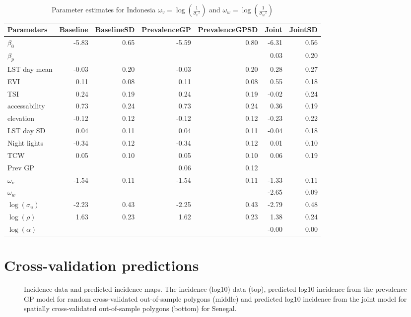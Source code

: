 \documentclass[10pt,a4]{article}
\begin{document}
\begin{table}[ht]
\centering
\begin{tabular}{lrrrrrr}
  \hline
Parameters & Baseline & BaselineSD & PrevalenceGP & PrevalenceGPSD & Joint & JointSD \\ 
  \hline
$\beta_0$ & -5.83 & 0.65 & -5.59 & 0.80 & -6.31 & 0.56 \\ 
  $\beta_p$ &  &  &  &  & 0.03 & 0.20 \\ 
  LST day mean & -0.03 & 0.20 & -0.03 & 0.20 & 0.28 & 0.27 \\ 
  EVI & 0.11 & 0.08 & 0.11 & 0.08 & 0.55 & 0.18 \\ 
  TSI & 0.24 & 0.19 & 0.24 & 0.19 & -0.02 & 0.24 \\ 
  accessability & 0.73 & 0.24 & 0.73 & 0.24 & 0.36 & 0.19 \\ 
  elevation & -0.12 & 0.12 & -0.12 & 0.12 & -0.23 & 0.22 \\ 
  LST day SD & 0.04 & 0.11 & 0.04 & 0.11 & -0.04 & 0.18 \\ 
  Night lights & -0.34 & 0.12 & -0.34 & 0.12 & 0.01 & 0.10 \\ 
  TCW & 0.05 & 0.10 & 0.05 & 0.10 & 0.06 & 0.19 \\ 
  Prev GP &  &  & 0.06 & 0.12 &  &  \\ 
  $\omega_v$ & -1.54 & 0.11 & -1.54 & 0.11 & -1.33 & 0.11 \\ 
  $\omega_w$ &  &  &  &  & -2.65 & 0.09 \\ 
  $\log(\sigma_u)$ & -2.23 & 0.43 & -2.25 & 0.43 & -2.79 & 0.48 \\ 
  $\log(\rho)$ & 1.63 & 0.23 & 1.62 & 0.23 & 1.38 & 0.24 \\ 
  $\log(\alpha)$ &  &  &  &  & -0.00 & 0.00 \\ 
   \hline
\end{tabular}
\label{parsidn}
\caption{Parameter estimates for Indonesia $\omega_v = \log\left(\frac{1}{{\sigma_v}^2}\right)$ and $\omega_w = \log\left(\frac{1}{{\sigma_w}^2}\right)$} 
\end{table}



\clearpage
\section{Cross-validation predictions}


\begin{figure}[h!]
\caption{\label{predobsmapsen1}
Incidence data and predicted incidence maps.
The incidence (log10) data (top), predicted log10 incidence from the prevalence GP model for random cross-validated out-of-sample polygons (middle) and predicted log10 incidence from the joint model for spatially cross-validated out-of-sample polygons (bottom) for Senegal.
}
\end{figure}
\end{document}
